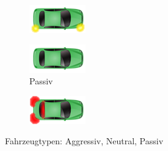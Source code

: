 \begin{figure}
\begin{subfigure}{0.1\linewidth}
	\label{fig:breakingn}
\end{subfigure} 
\begin{subfigure}{0.1\linewidth}
\centering
\includegraphics[width=\linewidth]{images/indicating_p}
\label{fig:indicatingp}
\end{subfigure}  
\begin{subfigure}{0.11\linewidth}
			\centering
			\includegraphics[width=\linewidth]{images/normal_p}
			\caption*{Passiv}
			\label{fig:normalp}
\end{subfigure} 
\begin{subfigure}{0.1\linewidth}
	\centering
	\includegraphics[width=\linewidth]{images/breaking_p}
	\label{fig:breakingp}
\end{subfigure}
\caption{Fahrzeugtypen: Aggressiv, Neutral, Passiv}
\label{fig:fahrzeug}
\end{figure}


